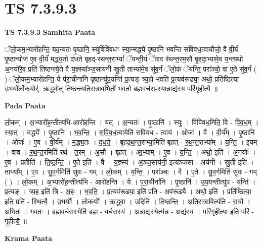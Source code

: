 \documentclass[17pt]{extarticle}
\begin{document}
\section{ TS 7.3.9.3 }

\textbf{TS 7.3.9.3 } \newline
\textbf{Samhita Paata} \newline

ॅलो॒कम॒भ्यारो॑हन्ति॒ यद॒न्यतः॑ पृ॒ष्ठानि॒ स्युर्विवि॑वधꣳ स्या॒न्मद्ध्ये॑ पृ॒ष्ठानि॑ भवन्ति सविवध॒त्वायौजो॒ वै वी॒र्यं॑ पृ॒ष्ठान्योज॑ ए॒व वी॒र्यं॑ मद्ध्य॒तो द॑धते बृहद्-रथन्त॒राभ्यां᳚ ॅयन्ती॒यं ॅवाव र॑थन्त॒रम॒सौ बृ॒हदा॒भ्यामे॒व य॒न्त्यथो॑ अ॒नयो॑रे॒व प्रति॑ तिष्ठन्त्ये॒ते वै य॒ज्ञ्स्या᳚ञ्ज॒साय॑नी स्रु॒ती ताभ्या॑मे॒व सु॑व॒र्गं ॅलो॒कं ॅय॑न्ति॒ परा᳚ञ्चो॒ वा ए॒ते सु॑व॒र्गं ( ) ॅलो॒कम॒भ्यारो॑हन्ति॒ ये प॑रा॒चीना॑नि पृ॒ष्ठान्यु॑प॒यन्ति॑ प्र॒त्यङ् त्र्य॒हो भ॑वति प्र॒त्यव॑रूढ्या॒ अथो॒ प्रति॑ष्ठित्या उ॒भयो᳚र्लो॒कयोर्॑. ऋ॒द्ध्वोत् ति॑ष्ठन्त्यतिरा॒त्राव॒भितो॑ भवतो ब्रह्मवर्च॒स-स्या॒न्नाद्य॑स्य॒ परि॑गृहीत्यै ॥ \newline

\textbf{Pada Paata} \newline

लो॒कम् । अ॒भ्यारो॑ह॒न्तीत्य॑भि-आरो॑हन्ति । यत् । अ॒न्यतः॑ । पृ॒ष्ठानि॑ । स्युः । विवि॑वध॒मिति॒ वि - वि॒व॒ध॒म् । स्या॒त् । मद्ध्ये᳚ । पृ॒ष्ठानि॑ । भ॒व॒न्ति॒ । स॒वि॒व॒ध॒त्वायेति॑ सविवध - त्वाय॑ । ओजः॑ । वै । वी॒र्य᳚म् । पृ॒ष्ठानि॑ । ओजः॑ । ए॒व । वी॒र्य᳚म् । म॒द्ध्य॒तः । द॒ध॒ते॒ । बृ॒ह॒द्र॒थ॒न्त॒राभ्या॒मिति॑ बृहत् - र॒थ॒न्त॒राभ्या᳚म् । य॒न्ति॒ । इ॒यम् । वाव । र॒थ॒न्त॒रमिति॑ रथं - त॒रम् । अ॒सौ । बृ॒हत् । आ॒भ्याम् । ए॒व । य॒न्ति॒ । अथो॒ इति॑ । अ॒नयोः᳚ । ए॒व । प्रतीति॑ । ति॒ष्ठ॒न्ति॒ । ए॒ते इति॑ । वै । य॒ज्ञ्स्य॑ । अ॒ञ्ज॒साय॑नी॒ इत्य॑ञ्जसा - अय॑नी । स्रु॒ती इति॑ । ताभ्या᳚म् । ए॒व । सु॒व॒र्गमिति॑ सुवः - गम् । लो॒कम् । य॒न्ति॒ । परा᳚ञ्चः । वै । ए॒ते । सु॒व॒र्गमिति॑ सुवः - गम् ( ) । लो॒कम् । अ॒भ्यारो॑ह॒न्तीत्य॑भि - आरो॑हन्ति । ये । प॒रा॒चीना॑नि । पृ॒ष्ठानि॑ । उ॒प॒यन्तीत्यु॑प - यन्ति॑ । प्र॒त्यङ् । त्र्य॒ह इति॑ त्रि - अ॒हः । भ॒व॒ति॒ । प्र॒त्यव॑रूढ्या॒ इति॑ प्रति - अव॑रूढ्यै । अथो॒ इति॑ । प्रति॑ष्ठित्या॒ इति॒ प्रति॑ - स्थि॒त्यै॒ । उ॒भयोः᳚ । लो॒कयोः᳚ । ऋ॒द्ध्वा । उदिति॑ । ति॒ष्ठ॒न्ति॒ । अ॒ति॒रा॒त्रावित्य॑ति - रा॒त्रौ । अ॒भितः॑ । भ॒व॒तः॒ । ब्र॒ह्म॒व॒र्च॒सस्येति॑ ब्रह्म - व॒र्च॒सस्य॑ । अ॒न्नाद्य॒स्येत्य॑न्न - अद्य॑स्य । परि॑गृहीत्या॒ इति॒ परि॑ - गृ॒ही॒त्यै॒ ॥  \newline


\textbf{Krama Paata} \newline
\end{document}
